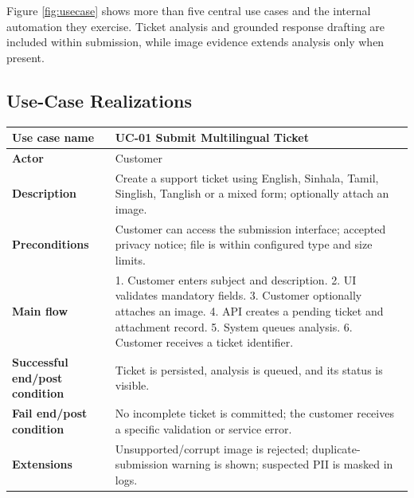 \documentclass[10pt,letterpaper]{article}
\newenvironment{ucase}[1]{%
\begin{table}[H]\centering\small
\begin{tabular}{|L{1.62in}|L{4.50in}|}\hline
\textbf{Use case name} & \textbf{#1}\\\hline}{%
\end{tabular}\end{table}}
\begin{document}
Figure \ref{fig:usecase} shows more than five central use cases and the internal automation they exercise. Ticket analysis and grounded response drafting are included within submission, while image evidence extends analysis only when present.

\subsection{Use-Case Realizations}

\begin{ucase}{UC-01 Submit Multilingual Ticket}
\textbf{Actor} & Customer\\\hline
\textbf{Description} & Create a support ticket using English, Sinhala, Tamil, Singlish, Tanglish or a mixed form; optionally attach an image.\\\hline
\textbf{Preconditions} & Customer can access the submission interface; accepted privacy notice; file is within configured type and size limits.\\\hline
\textbf{Main flow} & 1. Customer enters subject and description. 2. UI validates mandatory fields. 3. Customer optionally attaches an image. 4. API creates a pending ticket and attachment record. 5. System queues analysis. 6. Customer receives a ticket identifier.\\\hline
\textbf{Successful end/post condition} & Ticket is persisted, analysis is queued, and its status is visible.\\\hline
\textbf{Fail end/post condition} & No incomplete ticket is committed; the customer receives a specific validation or service error.\\\hline
\textbf{Extensions} & Unsupported/corrupt image is rejected; duplicate-submission warning is shown; suspected PII is masked in logs.\\\hline
\end{ucase}
\end{document}
